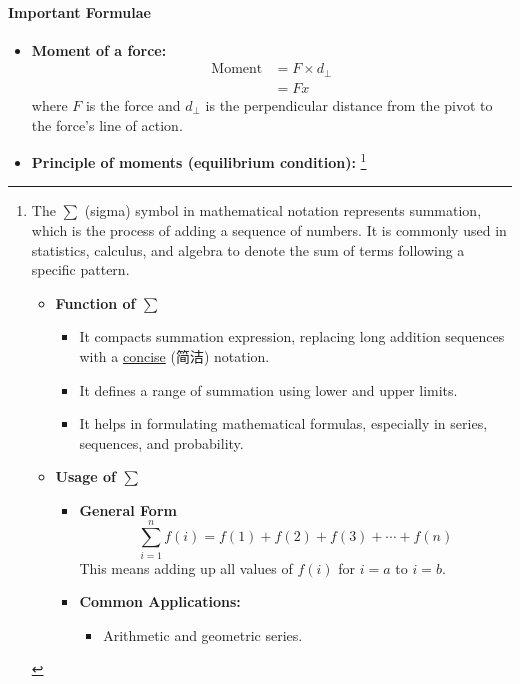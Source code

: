 \paragraph{Important Formulae}
\begin{itemize}
    \item \textbf{Moment of a force:}
    \begin{equation}
        \begin{split}
            \text{Moment} &= F \times d_{\perp} \\
            &= Fx
        \end{split}
    \end{equation}
    where $F$ is the force and $d_{\perp}$ is the perpendicular distance from the pivot to the force's line of action.
    \item \textbf{Principle of moments (equilibrium condition):} \footnote{The $\sum$ (sigma) symbol in mathematical notation
    represents summation, which is the process of adding a sequence of numbers. It is commonly used in statistics, calculus, and
    algebra to denote the sum of terms following a specific pattern.
    \begin{itemize}
        \item \textbf{Function of $\sum$}
        \begin{itemize}
            \item It compacts summation expression, replacing long addition sequences with a \underline{concise} (简洁) notation.
            \item It defines a range of summation using lower and upper limits.
            \item It helps in formulating mathematical formulas, especially in series, sequences, and probability.
        \end{itemize}
        \item \textbf{Usage of $\sum$}
        \begin{itemize}
            \item \textbf{General Form}
            \begin{equation*}
                \sum_{i = 1}^{n} f(i) = f(1) + f(2) + f(3) + \cdots + f(n)
            \end{equation*}
            This means adding up all values of $f(i)$ for $i = a$ to $i = b$.
            \item \textbf{Common Applications:}
            \begin{itemize}
                \item Arithmetic and geometric series.

\end{itemize}
\end{itemize}
\end{itemize}}
\end{itemize}
